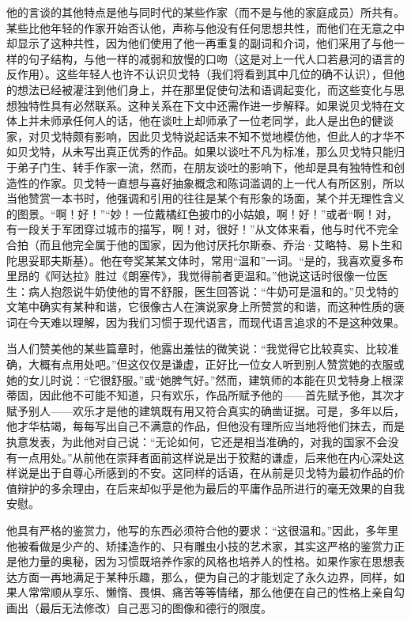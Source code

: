 \par 他的言谈的其他特点是他与同时代的某些作家（而不是与他的家庭成员）所共有。某些比他年轻的作家开始否认他，声称与他没有任何思想共性，而他们在无意之中却显示了这种共性，因为他们使用了他一再重复的副词和介词，他们采用了与他一样的句子结构，与他一样的减弱和放慢的口吻（这是对上一代人口若悬河的语言的反作用）。这些年轻人也许不认识贝戈特（我们将看到其中几位的确不认识），但他的想法已经被灌注到他们身上，并在那里促使句法和语调起变化，而这些变化与思想独特性具有必然联系。这种关系在下文中还需作进一步解释。如果说贝戈特在文体上并未师承任何人的话，他在谈吐上却师承了一位老同学，此人是出色的健谈家，对贝戈特颇有影响，因此贝戈特说起话来不知不觉地模仿他，但此人的才华不如贝戈特，从未写出真正优秀的作品。如果以谈吐不凡为标准，那么贝戈特只能归于弟子门生、转手作家一流，然而，在朋友谈吐的影响下，他却是具有独特性和创造性的作家。贝戈特一直想与喜好抽象概念和陈词滥调的上一代人有所区别，所以当他赞赏一本书时，他强调和引用的往往是某个有形象的场面，某个并无理性含义的图景。“啊！好！”“妙！一位戴橘红色披巾的小姑娘，啊！好！”或者“啊！对，有一段关于军团穿过城市的描写，啊！对，很好！”从文体来看，他与时代不完全合拍（而且他完全属于他的国家，因为他讨厌托尔斯泰、乔治·艾略特、易卜生和陀思妥耶夫斯基）。他在夸奖某某文体时，常用“温和”一词。“是的，我喜欢夏多布里昂的《阿达拉》胜过《朗塞传》，我觉得前者更温和。”他说这话时很像一位医生：病人抱怨说牛奶使他的胃不舒服，医生回答说：“牛奶可是温和的。”贝戈特的文笔中确实有某种和谐，它很像古人在演说家身上所赞赏的和谐，而这种性质的褒词在今天难以理解，因为我们习惯于现代语言，而现代语言追求的不是这种效果。
\par 当人们赞美他的某些篇章时，他露出羞怯的微笑说：“我觉得它比较真实、比较准确，大概有点用处吧。”但这仅仅是谦虚，正好比一位女人听到别人赞赏她的衣服或她的女儿时说：“它很舒服。”或“她脾气好。”然而，建筑师的本能在贝戈特身上根深蒂固，因此他不可能不知道，只有欢乐，作品所赋予他的——首先赋予他，其次才赋予别人——欢乐才是他的建筑既有用又符合真实的确凿证据。可是，多年以后，他才华枯竭，每每写出自己不满意的作品，但他没有理所应当地将他们抹去，而是执意发表，为此他对自己说：“无论如何，它还是相当准确的，对我的国家不会没有一点用处。”从前他在崇拜者面前这样说是出于狡黠的谦虚，后来他在内心深处这样说是出于自尊心所感到的不安。这同样的话语，在从前是贝戈特为最初作品的价值辩护的多余理由，在后来却似乎是他为最后的平庸作品所进行的毫无效果的自我安慰。
\par 他具有严格的鉴赏力，他写的东西必须符合他的要求：“这很温和。”因此，多年里他被看做是少产的、矫揉造作的、只有雕虫小技的艺术家，其实这严格的鉴赏力正是他力量的奥秘，因为习惯既培养作家的风格也培养人的性格。如果作家在思想表达方面一再地满足于某种乐趣，那么，便为自己的才能划定了永久边界，同样，如果人常常顺从享乐、懒惰、畏惧、痛苦等等情绪，那么他便在自己的性格上亲自勾画出（最后无法修改）自己恶习的图像和德行的限度。

